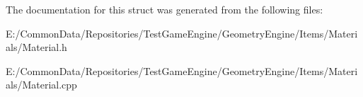 The documentation for this struct was generated from the following files\+:\begin{DoxyCompactItemize}
\item 
E\+:/\+Common\+Data/\+Repositories/\+Test\+Game\+Engine/\+Geometry\+Engine/\+Items/\+Materials/Material.\+h\item 
E\+:/\+Common\+Data/\+Repositories/\+Test\+Game\+Engine/\+Geometry\+Engine/\+Items/\+Materials/Material.\+cpp\end{DoxyCompactItemize}

